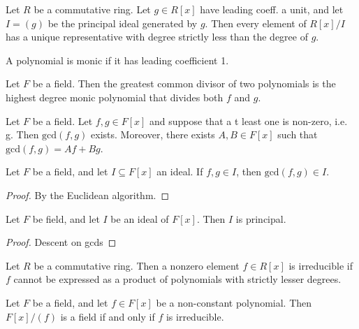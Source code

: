 \documentclass[12pt]{article}
\newenvironment{theorem}[2][Theorem]{\begin{trivlist}
    \item[\hskip \labelsep {\bfseries #1}\hskip \labelsep {\bfseries #2.}]}{\end{trivlist}}
\newenvironment{definition}[2][Definition]{\begin{trivlist}
    \item[\hskip \labelsep {\bfseries #1}\hskip \labelsep {\bfseries #2.}]}{\end{trivlist}}
\begin{document}
\begin{theorem}{:)}
    Let $R$ be a commutative ring. Let $g \in R[x]$ have leading coeff. a unit, and let $I = (g)$ be the principal ideal generated by $g$. Then every element of $R[x]/I$ has a unique representative with degree strictly less than the degree of $g$.
\end{theorem}

\begin{definition}{(Monic Polynomial)}
    A polynomial is monic if it has leading coefficient 1.
\end{definition}

\begin{definition}{{:)}}
    Let $F$ be a field. Then the greatest common divisor of two polynomials is the highest degree monic polynomial that divides both $f$ and $g$.
\end{definition}

\begin{theorem}{:)}
    Let $F$ be a field. Let $f, g \in F[x]$ and suppose that a t least one is non-zero, i.e. g. Then $\text{gcd}(f,g)$ exists. Moreover, there exists $A, B \in F[x]$ such that $\text{gcd}(f,g) = Af + Bg$.
\end{theorem}

\begin{theorem}{:)}
    Let $F$ be a field, and let $I \subseteq F[x]$ an ideal. If $f, g \in I$, then $\text{gcd}(f,g) \in I$.
    \begin{proof}
        By the Euclidean algorithm.
    \end{proof}
\end{theorem}

\begin{theorem}{:)}
    Let $F$ be  field, and let $I$ be an ideal of $F[x]$. Then $I$ is principal. 
    \begin{proof}
        Descent on gcds
    \end{proof}
\end{theorem}

\begin{theorem}{:)}
    Let $R$ be a commutative ring. Then a nonzero element $f \in R[x]$ is irreducible if $f$ cannot be expressed as a product of polynomials with strictly lesser degrees.
\end{theorem}

\begin{theorem}{:)}
    Let $F$ be a field, and let $f \in F[x]$ be a non-constant polynomial. Then $F[x]/(f)$ is a field if and only if $f$ is irreducible.
\end{theorem}
\end{document}
